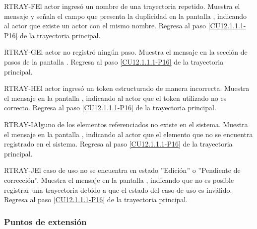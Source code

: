 	\begin{UCtrayectoriaA}{RTRAY-F}{El actor ingresó un nombre de una trayectoria repetido.}
		\UCpaso[\UCsist] Muestra el mensaje  y señala el campo que presenta la duplicidad en la pantalla , indicando al actor que existe un actor con el mismo nombre.
		\UCpaso Regresa al paso \ref{CU12.1.1.1-P16} de la trayectoria principal.
	\end{UCtrayectoriaA}

	\begin{UCtrayectoriaA}{RTRAY-G}{El actor no registró ningún paso.}
		\UCpaso[\UCsist] Muestra el mensaje  en la sección de pasos de la pantalla .
		\UCpaso Regresa al paso \ref{CU12.1.1.1-P16} de la trayectoria principal.
	\end{UCtrayectoriaA}

	\begin{UCtrayectoriaA}{RTRAY-H}{El actor ingresó un token estructurado de manera incorrecta.}
		\UCpaso[\UCsist] Muestra el mensaje  en la pantalla , indicando al actor que el token utilizado no es correcto.
		\UCpaso Regresa al paso \ref{CU12.1.1.1-P16} de la trayectoria principal.
	\end{UCtrayectoriaA}
	
	\begin{UCtrayectoriaA}{RTRAY-I}{Alguno de los elementos referenciados no existe en el sistema.}
		\UCpaso[\UCsist] Muestra el mensaje  en la pantalla , indicando al actor que el elemento que no se encuentra registrado en el sistema.
		\UCpaso Regresa al paso \ref{CU12.1.1.1-P16} de la trayectoria principal.
	\end{UCtrayectoriaA}

	\begin{UCtrayectoriaA}{RTRAY-J}{El caso de uso no se encuentra en estado ''Edición'' o ''Pendiente de corrección''.}
		\UCpaso[\UCsist] Muestra el mensaje  en la pantalla , indicando que no es posible registrar una trayectoria debido a que el estado del caso de uso es inválido.
		\UCpaso Regresa al paso \ref{CU12.1.1.1-P16} de la trayectoria principal.
	\end{UCtrayectoriaA}


\subsubsection{Puntos de extensión}

